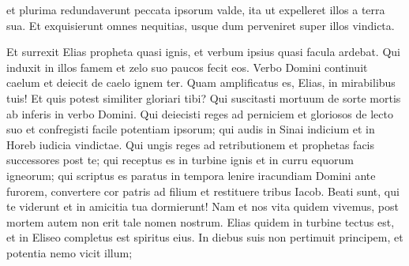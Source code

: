 \begin{biblechapter}
\begin{biblechapter}
\begin{biblechapter}
\begin{biblechapter}
\begin{biblechapter}
\begin{biblechapter}
\begin{biblechapter}
\begin{biblechapter}
\begin{biblechapter}
\begin{biblechapter}
\begin{biblechapter}
\begin{biblechapter}
\begin{biblechapter}
\begin{biblechapter}
\begin{biblechapter}
\begin{biblechapter}
\begin{biblechapter}
\begin{biblechapter}
\begin{biblechapter}
\begin{biblechapter}
\begin{biblechapter}
\begin{biblechapter}
\begin{biblechapter}
\begin{biblechapter}
\begin{biblechapter}
\begin{biblechapter}
\begin{biblechapter}
\begin{biblechapter}
\begin{biblechapter}
\begin{biblechapter}
\begin{biblechapter}
\begin{biblechapter}
\begin{biblechapter}
\begin{biblechapter}
\begin{biblechapter}
\begin{biblechapter}
\begin{biblechapter}
\begin{biblechapter}
\begin{biblechapter}
\begin{biblechapter}
\begin{biblechapter}
\begin{biblechapter}
\begin{biblechapter}
\begin{biblechapter}
\begin{biblechapter}
\begin{biblechapter}
\begin{biblechapter}
 et plurima redundaverunt peccata ipsorum valde,
 \verse ita ut expelleret illos a terra sua.
 \verse Et exquisierunt omnes nequitias,
 usque dum perveniret super illos vindicta.
 
\begin{biblechapter}
\verse Et surrexit Elias propheta quasi ignis,
 et verbum ipsius quasi facula ardebat.
 \verse Qui induxit in illos famem
 et zelo suo paucos fecit eos.
 \verse Verbo Domini continuit caelum
 et deiecit de caelo ignem ter.
 \verse Quam amplificatus es, Elias, in mirabilibus tuis!
 Et quis potest similiter gloriari tibi?
 \verse Qui suscitasti mortuum de sorte mortis
 ab inferis in verbo Domini.
 \verse Qui deiecisti reges ad perniciem
 et gloriosos de lecto suo
 et confregisti facile potentiam ipsorum;
 \verse qui audis in Sinai indicium
 et in Horeb iudicia vindictae.
 \verse Qui ungis reges ad retributionem
 et prophetas facis successores post te;
 \verse qui receptus es in turbine ignis
 et in curru equorum igneorum;
 \verse qui scriptus es paratus in tempora
 lenire iracundiam Domini ante furorem,
 convertere cor patris ad filium
 et restituere tribus Iacob.
 \verse Beati sunt, qui te viderunt
 et in amicitia tua dormierunt!
 \verse Nam et nos vita quidem vivemus,
 post mortem autem non erit tale nomen nostrum.
 \verse Elias quidem in turbine tectus est,
 et in Eliseo completus est spiritus eius.
 In diebus suis non pertimuit principem,
 et potentia nemo vicit illum;

\end{biblechapter}
\end{biblechapter}
\end{biblechapter}
\end{biblechapter}
\end{biblechapter}
\end{biblechapter}
\end{biblechapter}
\end{biblechapter}
\end{biblechapter}
\end{biblechapter}
\end{biblechapter}
\end{biblechapter}
\end{biblechapter}
\end{biblechapter}
\end{biblechapter}
\end{biblechapter}
\end{biblechapter}
\end{biblechapter}
\end{biblechapter}
\end{biblechapter}
\end{biblechapter}
\end{biblechapter}
\end{biblechapter}
\end{biblechapter}
\end{biblechapter}
\end{biblechapter}
\end{biblechapter}
\end{biblechapter}
\end{biblechapter}
\end{biblechapter}
\end{biblechapter}
\end{biblechapter}
\end{biblechapter}
\end{biblechapter}
\end{biblechapter}
\end{biblechapter}
\end{biblechapter}
\end{biblechapter}
\end{biblechapter}
\end{biblechapter}
\end{biblechapter}
\end{biblechapter}
\end{biblechapter}
\end{biblechapter}
\end{biblechapter}
\end{biblechapter}
\end{biblechapter}
\end{biblechapter}
